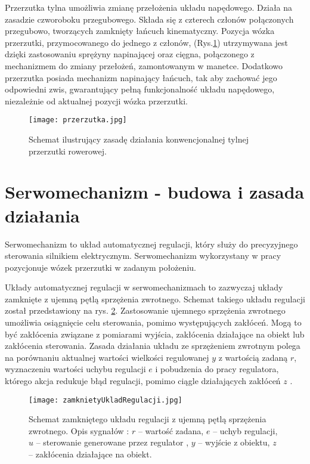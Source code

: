 Przerzutka tylna umożliwia zmianę przełożenia układu napędowego. Działa na zasadzie czworoboku przegubowego. Składa się z czterech członów połączonych przegubowo, tworzących zamknięty łańcuch kinematyczny. Pozycja wózka przerzutki, przymocowanego do jednego z członów, (Rys.\ref{fig:przerzutka}) utrzymywana jest dzięki zastosowaniu sprężyny napinającej oraz cięgna, połączonego z mechanizmem do zmiany przełożeń, zamontowanym w manetce. Dodatkowo przerzutka posiada mechanizm napinający łańcuch, tak aby zachować jego odpowiedni zwis, gwarantujący pełną funkcjonalność układu napędowego, niezależnie od aktualnej pozycji wózka przerzutki. 
\begin{figure}[h]
    \centering
    \texttt{[image: przerzutka.jpg]}
    \caption{Schemat ilustrujący zasadę działania konwencjonalnej tylnej przerzutki rowerowej.}
    \label{fig:przerzutka}
\end{figure}

\section{Serwomechanizm - budowa i zasada działania}
Serwomechanizm to układ automatycznej regulacji, który służy do precyzyjnego sterowania silnikiem elektrycznym. Serwomechanizm wykorzystany w pracy pozycjonuje wózek przerzutki w zadanym położeniu.

Układy automatycznej regulacji w serwomechanizmach to zazwyczaj układy zamknięte z ujemną pętlą sprzężenia zwrotnego. Schemat takiego układu regulacji został przedstawiony na rys. \ref{fig:zamknietyUklad}. Zastosowanie ujemnego sprzężenia zwrotnego umożliwia osiągnięcie celu sterowania, pomimo występujących zakłóceń. Mogą to być zakłócenia związane z pomiarami wyjścia, zakłócenia działające na obiekt lub zakłócenia sterowania. Zasada działania układu ze sprzężeniem zwrotnym polega na porównaniu aktualnej wartości wielkości regulowanej $y$ z wartością zadaną $r$, wyznaczeniu wartości uchybu regulacji $e$ i pobudzenia do pracy regulatora, którego akcja redukuje błąd regulacji, pomimo ciągle działających zakłóceń $z$ \cite{zamknietyB}.
\begin{figure}[h]
    \centering
    \texttt{[image: zamknietyUkladRegulacji.jpg]}
    \caption{Schemat zamkniętego układu regulacji z ujemną pętlą sprzężenia zwrotnego. Opis sygnałów : $r$ – wartość zadana,  $e$ – uchyb regulacji, $u$ – sterowanie generowane przez regulator , $y$ – wyjście z obiektu, $z$ – zakłócenia działające na obiekt.}
    \label{fig:zamknietyUklad}
\end{figure}

